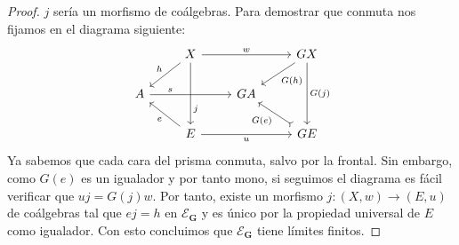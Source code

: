 \begin{proof}
  $j$ sería un morfismo de coálgebras. Para demostrar que conmuta nos fijamos en el diagrama siguiente:
  \begin{equation*}
    \begin{tikzcd}
      {} & X\ar{rr}{w}\ar[swap]{ld}{h}\ar[crossing over, near end]{dd}{j} & {} & GX\ar{ld}{G(h)}\ar{dd}{G(j)} \\
      A\ar[near start]{rr}{s} & {} & GA & {} \\
      {} & E\ar{lu}{e}\ar[swap]{rr}{u} & {} & GE\ar[tail]{lu}{G(e)} 
    \end{tikzcd}
  \end{equation*}
  Ya sabemos que cada cara del prisma conmuta, salvo por la frontal. Sin embargo, como $G(e)$ es un igualador
  y por tanto mono, si seguimos el diagrama es fácil verificar que $uj=G(j)w$. Por tanto, existe un morfismo 
  $j\colon (X,w)\to (E,u)$ de coálgebras tal que $ej=h$ en $\mathcal{E}_\textbf{G}$ y es único por la propiedad universal de $E$ como igualador. 
  Con esto concluimos que $\mathcal{E}_\textbf{G}$ tiene límites finitos.
\end{proof}


